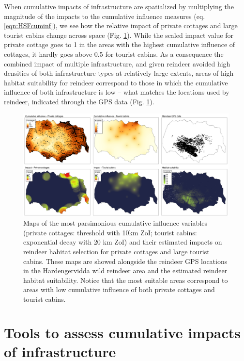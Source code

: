 \documentclass[titlepage]{article}
\begin{document}
When cumulative impacts of infrastructure are spatialized by multiplying the magnitude of the impacts to the cumulative influence measures (eq. \ref{eqn:HSFcuminf}), we see how the relative impact of private cottages and large tourist cabins change across space (Fig. \ref{fig:prediction_maps}). While the scaled impact value for private cottage goes to 1 in the areas with the highest cumulative influence of cottages, it hardly goes above 0.5 for tourist cabins. As a consequence the combined impact of multiple infrastructure, and given reindeer
avoided high densities of both infrastructure types at relatively large extents, 
areas of high habitat suitability for reindeer correspond to those in which the
cumulative influence of both infrastructure is low -- what matches the
locations used by reindeer, indicated through the GPS data (Fig. \ref{fig:prediction_maps}).

\begin{figure}[h]
\centering
\includegraphics[width=1.3\textwidth,center]{figures/reindeer_results_prediction_maps.png}
\caption{\label{fig:prediction_maps} Maps of the most parsimonious cumulative influence variables (private cottages: threshold with 10km ZoI; tourist cabins: exponential decay with 20 km ZoI) and their estimated impacts on reindeer habitat selection for private cottages and large tourist cabins. These maps are showed alongside the reindeer GPS locations in the Hardengervidda wild reindeer area and the estimated reindeer habitat suitability. Notice that the most suitable areas correspond to areas with low cumulative influence of both private cottages and tourist cabins.}
\end{figure}

\section{Tools to assess cumulative impacts of infrastructure}
\end{document}
